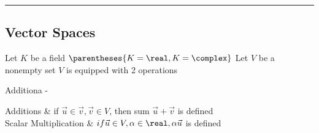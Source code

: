 \documentclass[12pt]{article}
\newcommand{\divider}[0]{\rule{\textwidth}{0.1pt}}
\begin{document}
\divider

\subsection{Vector Spaces}

Let $K$ be a field $\parentheses{K = \real, K = \complex}$
Let $V$ be a nonempty set
$V$ is equipped with 2 operations

Additiona - 

\begin{tabular}[@{} l l]
	Additions	& if $\vec{u} \in \vec{v}, \vec{v} \in V$, then sum $\vec{u} + \vec{v}$ is defined \\
	Scalar Multiplication & $if \vec{u} \in V, \alpha \in \real, \alpha \vec{u}$ is defined
	
\end{tabular}
\end{document}
